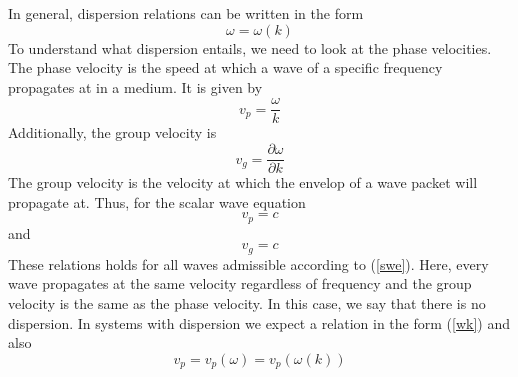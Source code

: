 \documentclass{article}
\begin{document}
In general, dispersion relations can be written in the form
\begin{equation} \label{wk}
\omega = \omega(k)
\end{equation}
To understand what dispersion entails, we need to look at the phase velocities. 
The phase velocity is the speed at which a wave of a specific frequency 
propagates at in a medium. It is given by
\begin{equation}
v_p = \frac{\omega}{k}
\end{equation}
Additionally, the group velocity is
\begin{equation}
v_g = \frac{\partial \omega}{\partial k}
\end{equation}
The group velocity is the velocity at which the envelop of a wave packet will 
propagate at. Thus, for the scalar wave equation 
\begin{equation}
v_p = c
\end{equation}
and
\begin{equation}
v_g = c
\end{equation}
These relations holds for all waves admissible according to (\ref{swe}). Here, 
every wave propagates at the same velocity regardless of frequency and the 
group velocity is the same as the phase velocity. In this 
case, we say that there is no dispersion. In systems with 
dispersion we expect a relation in the form (\ref{wk}) and also
\begin{equation}
v_p = v_p(\omega) = v_p(\omega(k))
\end{equation}
\end{document}
